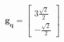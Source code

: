 \documentclass[preview]{standalone}
\begin{document}
\begin{align*}
\mathbf{g_q} = \begin{bmatrix} 3\frac{\sqrt{2}}{2} \\ -\frac{\sqrt{2}}{2} \end{bmatrix}
\end{align*}
\end{document}
